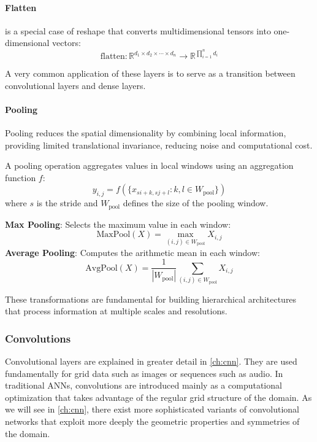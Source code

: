 \paragraph{Flatten} is a special case of reshape that converts multidimensional tensors into one-dimensional vectors:
\[
\text{flatten}: \mathbb{R}^{d_1 \times d_2 \times \cdots \times d_n} \to \mathbb{R}^{\prod_{i=1}^n d_i}
\]

A very common application of these layers is to serve as a transition between convolutional layers and dense layers.

\paragraph{Pooling}

Pooling reduces the spatial dimensionality by combining local information, providing limited translational invariance, reducing noise and computational cost.

\begin{definition}\label{def:pooling}
	A pooling operation aggregates values in local windows using an aggregation function $f$:
	\[
	y_{i,j} = f\left(\{x_{si+k, sj+l} : k,l \in W_{\text{pool}}\}\right)
	\]
	where $s$ is the stride and $W_{\text{pool}}$ defines the size of the pooling window.
\end{definition}

\textbf{Max Pooling}: Selects the maximum value in each window:
\[
\text{MaxPool}(X) = \max_{(i,j) \in W_{\text{pool}}} X_{i,j}
\]
\textbf{Average Pooling}: Computes the arithmetic mean in each window:
\[
\text{AvgPool}(X) = \frac{1}{|W_{\text{pool}}|} \sum_{(i,j) \in W_{\text{pool}}} X_{i,j}
\]

These transformations are fundamental for building hierarchical architectures that process information at multiple scales and resolutions.

\subsubsection{Convolutions}

Convolutional layers are explained in greater detail in \autoref{ch:cnn}. They are used fundamentally for grid data such as images or sequences such as audio. In traditional \glspl{ANN}, convolutions are introduced mainly as a computational optimization that takes advantage of the regular grid structure of the domain. As we will see in \autoref{ch:cnn}, there exist more sophisticated variants of convolutional networks that exploit more deeply the geometric properties and symmetries of the domain.

